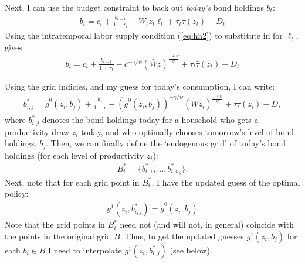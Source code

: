 \documentclass[12pt]{article}
\begin{document}
Next, I can use the budget constraint to back out \textit{today's} bond holdings $b_t$:
\begin{align*}
b_t = c_t + \frac{b_{t+1}}{1+r_t} -  W_tz_t\ell_t + \tau_t\bar\tau(z_t) - D_t
\end{align*}
Using the intratemporal labor supply condition (\ref{eq:hh2}) to substitute in for $\ell_t$, gives
\begin{align*}
b_t = c_t + \frac{b_{t+1}}{1+r_t} -  c^{-\gamma/\psi}(\bar Wz)^{\frac{1+\psi}{\psi}} + \tau_t\bar\tau(z_t) - D_t
\end{align*}

Using the grid indicies, and my guess for today's consumption, I can write:
\begin{align*}
b^*_{i,j} = \tilde g^0(z_i,b_j) + \frac{b_j}{1+r} - \left(\tilde g^0(z_i,b_j)\right)^{-\gamma/\psi} (\bar Wz_i)^{\frac{1+\psi}{\psi}} + \tau\bar\tau(z_i) - \bar D ,
\end{align*}
where $b^*_{i,j}$ denotes the bond holdings today for a household who gets a productivity draw $z_i$ today, and who optimally chooses tomorrow's level of bond holdings, $b_j$. Then, we can finally define the `endogenous grid' of today's bond holdings (for each level of productivity $z_i$):
\begin{align*}
B_i^* = \{ b^*_{i,1}, ... , b^*_{i,n_b}\}.
\end{align*}
Next, note that for each grid point in $B_i^*$, I have the updated guess of the optimal policy:
\begin{align*}
g^1(z_i,b^*_{i,j}) =  \tilde g^0(z_i,b_j)
\end{align*}
Note that the grid points in $B_i^*$ need not (and will not, in general) coincide with the points in the original grid $B$. Thus, to get the updated guesses $g^1(z_i,b_j)$ for each $b_i \in B$ I need to interpolate $g^1(z_i,b^*_{i,j})$ (see below).\\
\end{document}
